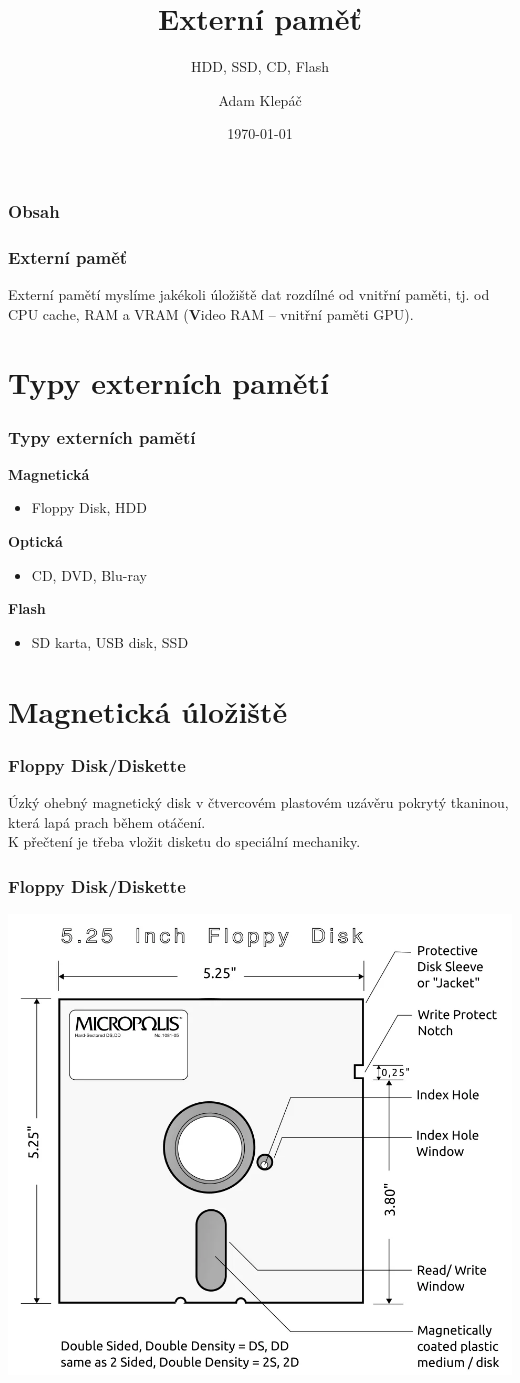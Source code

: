 \documentclass[aspectratio=169,11pt,svgnames]{beamer}
\title{Externí paměť}
\subtitle{HDD, SSD, CD, Flash}
\date{\today}
\author{Adam Klepáč}
\institute[GEVO]{Gymnázium Evolution Jižní Město}
\begin{document}
\titleframe

\begin{frame}
 \frametitle{Obsah}
 \tableofcontents
\end{frame}

\begin{frame}
 \frametitle{Externí paměť}
 \begin{tcolorbox}[title=Co je externí paměť]
  Externí pamětí myslíme jakékoli úložiště dat rozdílné od vnitřní paměti, tj.
  od CPU cache, RAM a VRAM (\textbf{V}ideo RAM -- vnitřní paměti GPU).
 \end{tcolorbox}
\end{frame}

\section{Typy externích pamětí}

\begin{frame}
 \frametitle{Typy externích pamětí}
 \textbf{Magnetická}
 \begin{itemize}[label=\textbullet]
  \item Floppy Disk, HDD
 \end{itemize}
 \pause
 \textbf{Optická}
 \begin{itemize}[label=\textbullet]
  \item CD, DVD, Blu-ray
 \end{itemize}
 \pause
 \textbf{Flash}
 \begin{itemize}[label=\textbullet]
  \item SD karta, USB disk, SSD
 \end{itemize}
\end{frame}

\section{Magnetická úložiště}

\begin{frame}
 \frametitle{Floppy Disk/Diskette}
 Úzký ohebný magnetický disk v čtvercovém plastovém uzávěru pokrytý tkaninou,
 která lapá prach během otáčení.\\
 \pause
 K přečtení je třeba vložit disketu do speciální mechaniky.
\end{frame}

\begin{frame}
 \frametitle{Floppy Disk/Diskette}
 \begin{center}
  \includegraphics[width=.5\textwidth]{floppy}
 \end{center}
\end{frame}
\end{document}
